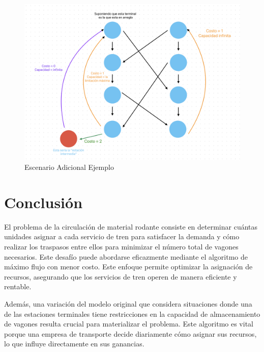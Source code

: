 \documentclass{article}
\begin{document}
    \vspace{6cm}
    
\begin{figure}[h!]
    \raggedright
    \centering

    \includegraphics[scale=0.35]{ejercicio5.png}
    \caption{Escenario Adicional Ejemplo}

    \label{fig:ejemplo}
\end{figure}






    
\section{Conclusión}
    \vspace{0.5cm}
    El problema de la circulación de material rodante consiste en determinar cuántas unidades asignar a cada servicio de tren para satisfacer la demanda y cómo realizar los traspasos entre ellos para minimizar el número total de vagones necesarios. Este desafío puede abordarse eficazmente mediante el algoritmo de máximo flujo con menor costo. Este enfoque permite optimizar la asignación de recursos, asegurando que los servicios de tren operen de manera eficiente y rentable.

Además, una variación del modelo original que considera situaciones donde una de las estaciones terminales tiene restricciones en la capacidad de almacenamiento de vagones resulta crucial para materializar el problema. Este algoritmo es vital porque una empresa de transporte decide diariamente cómo asignar sus recursos, lo que influye directamente en sus ganancias.
\end{document}
